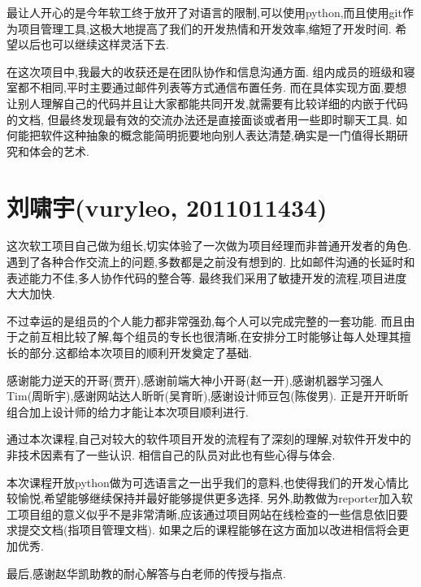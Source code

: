   最让人开心的是今年软工终于放开了对语言的限制,可以使用python,而且使用git作为项目管理工具,这极大地提高了我们的开发热情和开发效率,缩短了开发时间.
  希望以后也可以继续这样灵活下去.

  在这次项目中,我最大的收获还是在团队协作和信息沟通方面.
  组内成员的班级和寝室都不相同,平时主要通过邮件列表等方式通信布置任务.
  而在具体实现方面,要想让别人理解自己的代码并且让大家都能共同开发,就需要有比较详细的内嵌于代码的文档,
  但最终发现最有效的交流办法还是直接面谈或者用一些即时聊天工具.
  如何能把软件这种抽象的概念能简明扼要地向别人表达清楚,确实是一门值得长期研究和体会的艺术.

\section{刘啸宇(vuryleo, 2011011434)}
  这次软工项目自己做为组长,切实体验了一次做为项目经理而非普通开发者的角色.遇到了各种合作交流上的问题,多数都是之前没有想到的.
  比如邮件沟通的长延时和表述能力不佳,多人协作代码的整合等.
  最终我们采用了敏捷开发的流程,项目进度大大加快.

  不过幸运的是组员的个人能力都非常强劲,每个人可以完成完整的一套功能.
  而且由于之前互相比较了解,每个组员的专长也很清晰,在安排分工时能够让每人处理其擅长的部分.这都给本次项目的顺利开发奠定了基础.

  感谢能力逆天的开哥(贾开),感谢前端大神小开哥(赵一开),感谢机器学习强人Tim(周昕宇),感谢网站达人昕昕(吴育昕),感谢设计师豆包(陈俊男).
  正是开开昕昕组合加上设计师的给力才能让本次项目顺利进行.

  通过本次课程,自己对较大的软件项目开发的流程有了深刻的理解,对软件开发中的非技术因素有了一些认识.
  相信自己的队员对此也有些心得与体会.

  本次课程开放python做为可选语言之一出乎我们的意料,也使得我们的开发心情比较愉悦,希望能够继续保持并最好能够提供更多选择.
  另外,助教做为reporter加入软工项目组的意义似乎不是非常清晰,应该通过项目网站在线检查的一些信息依旧要求提交文档(指项目管理文档).
  如果之后的课程能够在这方面加以改进相信将会更加优秀.

  最后,感谢赵华凯助教的耐心解答与白老师的传授与指点.

